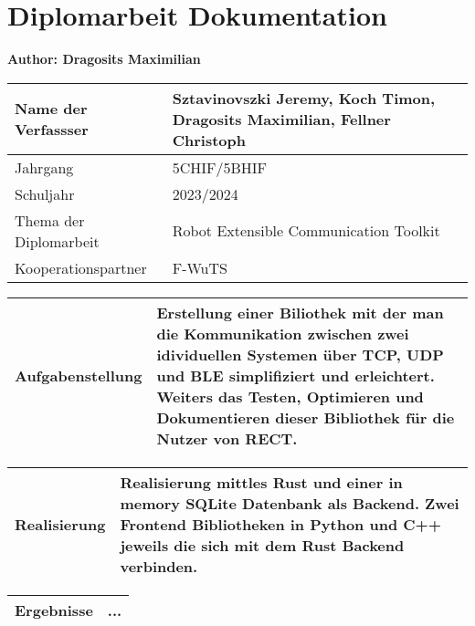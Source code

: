 \chapter{Diplomarbeit Dokumentation}
\textbf{Author: Dragosits Maximilian}

\begin{center}
\begin{tabular}{| m{8cm} | m{8cm} |}
    \hline
    Name der Verfassser & Sztavinovszki Jeremy, Koch Timon, Dragosits Maximilian, Fellner Christoph\\
    \hline
    Jahrgang & 5CHIF/5BHIF\\
    Schuljahr & 2023/2024\\
    \hline
    Thema der Diplomarbeit & Robot Extensible Communication Toolkit\\
    \hline
    Kooperationspartner & F-WuTS\\
    \hline
\end{tabular}

\vspace{5mm}

\begin{tabular}{| m{8cm} | m{8cm} |}
    \hline
    Aufgabenstellung & Erstellung einer Biliothek mit der man die Kommunikation zwischen zwei idividuellen Systemen über TCP, UDP und BLE simplifiziert und erleichtert. Weiters das Testen, Optimieren und Dokumentieren dieser Bibliothek für die Nutzer von RECT.\\ %
    \hline
\end{tabular}

\vspace{5mm}

\begin{tabular}{| m{8cm} | m{8cm} |}
    \hline
    Realisierung & Realisierung mittles Rust und einer in memory SQLite Datenbank als Backend. Zwei Frontend Bibliotheken in Python und C++ jeweils die sich mit dem Rust Backend verbinden.\\ %
    \hline
\end{tabular}

\vspace{5mm}

\begin{tabular}{| m{8cm} | m{8cm} |}
    \hline
    Ergebnisse & ...\\ %
    \hline
\end{tabular}


\end{center}
